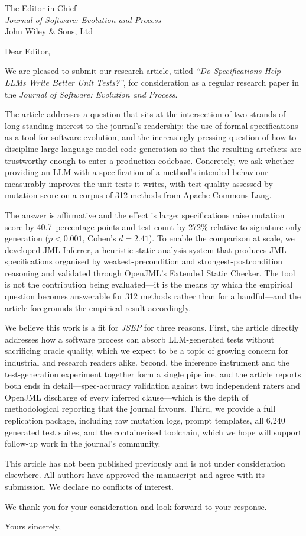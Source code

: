 \documentclass[11pt]{letter}
\begin{document}
\begin{letter}{The Editor-in-Chief \\ \emph{Journal of Software: Evolution and Process} \\ John Wiley \& Sons, Ltd}

\opening{Dear Editor,}

We are pleased to submit our research article, titled \emph{``Do Specifications Help LLMs Write Better Unit Tests?''}, for consideration as a regular research paper in the \emph{Journal of Software: Evolution and Process}.

The article addresses a question that sits at the intersection of two strands of long-standing interest to the journal's readership: the use of formal specifications as a tool for software evolution, and the increasingly pressing question of how to discipline large-language-model code generation so that the resulting artefacts are trustworthy enough to enter a production codebase. Concretely, we ask whether providing an LLM with a specification of a method's intended behaviour measurably improves the unit tests it writes, with test quality assessed by mutation score on a corpus of 312 methods from Apache Commons Lang.

The answer is affirmative and the effect is large: specifications raise mutation score by 40.7~percentage points and test count by 272\% relative to signature-only generation ($p < 0.001$, Cohen's $d = 2.41$). To enable the comparison at scale, we developed JML-Inferrer, a heuristic static-analysis system that produces JML specifications organised by weakest-precondition and strongest-postcondition reasoning and validated through OpenJML's Extended Static Checker. The tool is not the contribution being evaluated---it is the means by which the empirical question becomes answerable for 312 methods rather than for a handful---and the article foregrounds the empirical result accordingly.

We believe this work is a fit for \emph{JSEP} for three reasons. First, the article directly addresses how a software process can absorb LLM-generated tests without sacrificing oracle quality, which we expect to be a topic of growing concern for industrial and research readers alike. Second, the inference instrument and the test-generation experiment together form a single pipeline, and the article reports both ends in detail---spec-accuracy validation against two independent raters and OpenJML discharge of every inferred clause---which is the depth of methodological reporting that the journal favours. Third, we provide a full replication package, including raw mutation logs, prompt templates, all 6{,}240 generated test suites, and the containerised toolchain, which we hope will support follow-up work in the journal's community.

This article has not been published previously and is not under consideration elsewhere. All authors have approved the manuscript and agree with its submission. We declare no conflicts of interest.

We thank you for your consideration and look forward to your response.

\closing{Yours sincerely,}

\end{letter}
\end{document}
